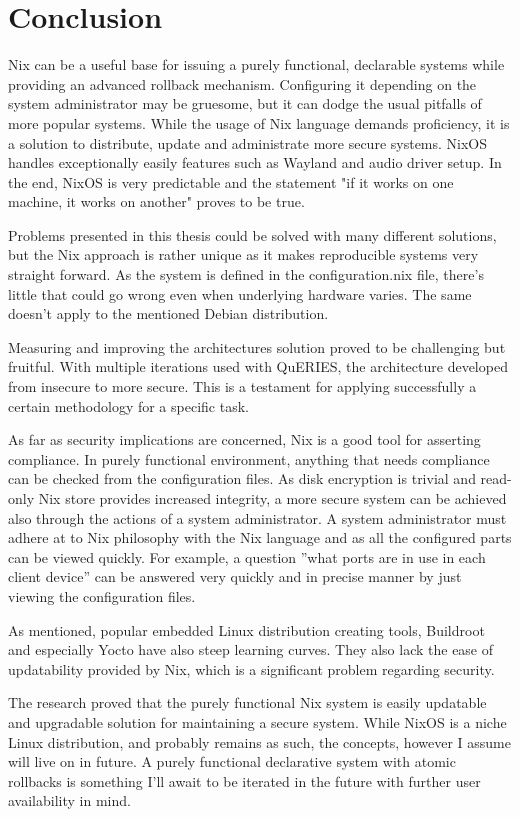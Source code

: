 \chapter{Conclusion} \label{conclusion}

Nix can be a useful base for issuing a purely functional, declarable
systems while providing an advanced rollback mechanism. Configuring it
depending on the system administrator may be gruesome, but it can
dodge the usual pitfalls of more popular systems. While the usage of
Nix language demands proficiency, it is a solution to distribute,
update and administrate more secure systems. NixOS handles
exceptionally easily features such as Wayland and audio driver
setup. In the end, NixOS is very predictable and the statement "if it
works on one machine, it works on another" proves to be true.

Problems presented in this thesis could be solved with many different solutions,
but the Nix approach is rather unique as it makes reproducible systems
very straight forward. As the system is defined in the
configuration.nix file, there's little that could go wrong even when
underlying hardware varies. The same doesn't apply to the mentioned
Debian distribution.

Measuring and improving the architectures solution proved to be
challenging but fruitful. With multiple iterations used with QuERIES,
the architecture developed from insecure to more secure. This is a
testament for applying successfully a certain methodology for a
specific task.

As far as security implications are concerned, Nix is a good tool for
asserting compliance. In purely functional environment, anything that
needs compliance can be checked from the configuration files. As disk
encryption is trivial and read-only Nix store provides increased
integrity, a more secure system can be achieved also through the
actions of a system administrator. A system administrator must adhere
at to Nix philosophy with the Nix language and as all the configured
parts can be viewed quickly. For example, a question ''what ports are
in use in each client device'' can be answered very quickly and in
precise manner by just viewing the configuration files.

As mentioned, popular embedded Linux distribution creating tools,
Buildroot and especially Yocto have also steep learning curves. They
also lack the ease of updatability provided by Nix, which is a
significant problem regarding security.

The research proved that the purely functional Nix system is easily
updatable and upgradable solution for maintaining a secure system.
While NixOS is a niche Linux distribution, and probably remains as
such, the concepts, however I assume will live on in future. A purely
functional declarative system with atomic rollbacks is something I'll
await to be iterated in the future with further user availability in
mind.
